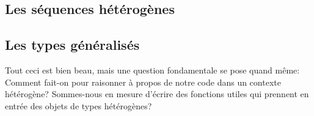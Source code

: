 \subsection{Les séquences hétérogènes}



\subsection{Les types généralisés}
Tout ceci est bien beau, mais une question fondamentale se pose quand même:
Comment fait-on pour raisonner à propos de notre code dans un contexte
hétérogène? Sommes-nous en mesure d'écrire des fonctions utiles qui prennent
en entrée des objets de types hétérogènes?
